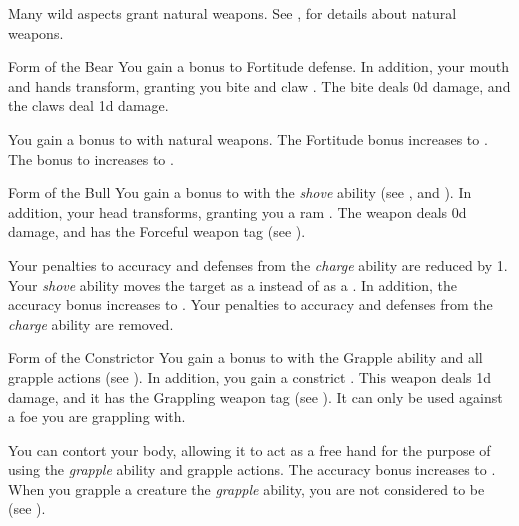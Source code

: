         Many wild aspects grant natural weapons.
        See , for details about natural weapons.

        {
            \begin{freeability}{Form of the Bear}
                You gain a  bonus to Fortitude defense.
                In addition, your mouth and hands transform, granting you bite and claw .
                The bite deals \plus0d damage, and the claws deal \minus1d damage.

                \rankline
                 You gain a  bonus to  with natural weapons.
                 The Fortitude bonus increases to .
                 The bonus to  increases to .
            \end{freeability}

            \begin{freeability}{Form of the Bull}
                You gain a  bonus to  with the \textit{shove} ability (see , and ).
                In addition, your head transforms, granting you a ram .
                The weapon deals \plus0d damage, and has the Forceful weapon tag (see ).

                \rankline
                 Your penalties to accuracy and defenses from the \textit{charge} ability are reduced by 1.
                 Your \textit{shove} ability moves the target as a  instead of as a .
                In addition, the accuracy bonus increases to .
                 Your penalties to accuracy and defenses from the \textit{charge} ability are removed.
            \end{freeability}

            \begin{freeability}{Form of the Constrictor}
                You gain a  bonus to  with the Grapple ability and all grapple actions (see ).
                In addition, you gain a constrict .
                This weapon deals \plus1d damage, and it has the Grappling weapon tag (see ).
                It can only be used against a foe you are grappling with.

                \rankline
                 You can contort your body, allowing it to act as a free hand for the purpose of using the \textit{grapple} ability and grapple actions.
                 The accuracy bonus increases to .
                 When you grapple a creature the \textit{grapple} ability, you are not considered to be  (see ).
            \end{freeability}

}
